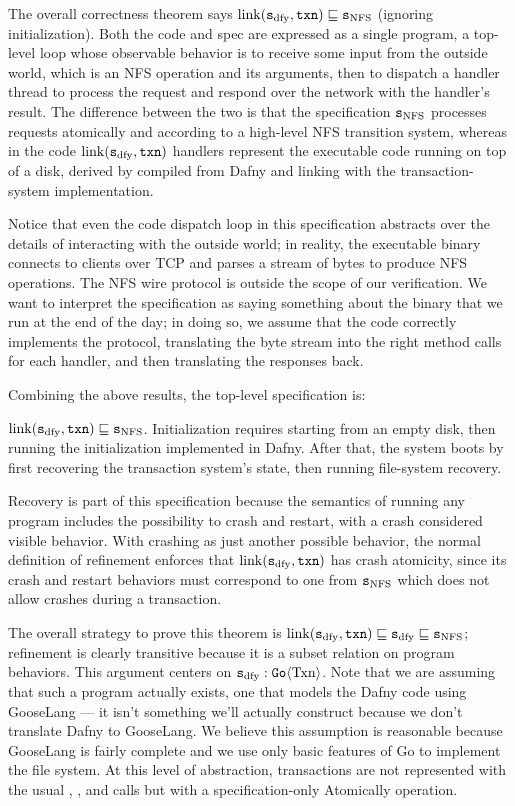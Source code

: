 The overall correctness theorem says
$\mathrm{link}(\texttt{s}_{\mathrm{dfy}}, \texttt{txn}) \sqsubseteq \texttt{s}_{\mathrm{NFS}}$ (ignoring initialization). Both the code and spec
are expressed as a single program, a top-level loop whose
observable behavior is to receive some input from the outside world, which is an
NFS operation and its arguments, then to dispatch a handler thread to process
the request and respond over the network with the handler's result. The
difference between the two is that the specification $\texttt{s}_{\mathrm{NFS}}$ processes requests
atomically and according to a high-level NFS transition system, whereas in the
code $\mathrm{link}(\texttt{s}_{\mathrm{dfy}}, \texttt{txn})$ handlers represent the executable code running on top of a
disk, derived by compiled from Dafny and linking with the transaction-system
implementation.

Notice that even the code dispatch loop in this specification abstracts over the
details of interacting with the outside world; in reality, the executable binary connects
to clients over TCP and parses a stream of bytes to produce NFS operations. The
NFS wire protocol is outside the scope of our verification. We want to
interpret the specification as saying something about the binary that we run at
the end of the day; in doing so, we assume that the code correctly implements
the protocol, translating the byte stream into the right method calls for each
handler, and then translating the responses back.

Combining the above results, the top-level specification is:

\begin{theorem}
  $\mathrm{link}(\texttt{s}_{\mathrm{dfy}}, \texttt{txn}) \sqsubseteq \texttt{s}_{\mathrm{NFS}}$. Initialization requires
  starting from an empty disk, then running the initialization implemented in
  Dafny. After that, the system boots by first recovering the transaction
  system's state, then running file-system recovery.
  \label{thm:correctness}
\end{theorem}

Recovery is part of this specification because the semantics of running any
program includes the possibility to crash and restart, with a crash considered
visible behavior. With crashing as just another possible behavior, the normal
definition of refinement enforces that $\mathrm{link}(\texttt{s}_{\mathrm{dfy}}, \texttt{txn})$ has crash atomicity, since
its crash and restart behaviors must correspond to one from $\texttt{s}_{\mathrm{NFS}}$ which does
not allow crashes during a transaction.

The overall strategy to prove this theorem is
$\mathrm{link}(\texttt{s}_{\mathrm{dfy}}, \texttt{txn}) \sqsubseteq \texttt{s}_{\mathrm{dfy}} \sqsubseteq \texttt{s}_{\mathrm{NFS}}$; refinement is clearly transitive
because it is a subset relation on program behaviors. This argument
centers on $\texttt{s}_{\mathrm{dfy}} : \mathtt{Go}\langle \mathrm{Txn} \rangle$. Note that we are assuming that
such a program actually exists, one that models the Dafny code using GooseLang
--- it isn't something we'll actually construct because we don't translate Dafny
to GooseLang. We believe this assumption is reasonable because GooseLang is
fairly complete and we use only basic features of Go to implement the file
system. At this level of abstraction, transactions are not represented with the
usual , , and  calls but with a
specification-only Atomically operation.

